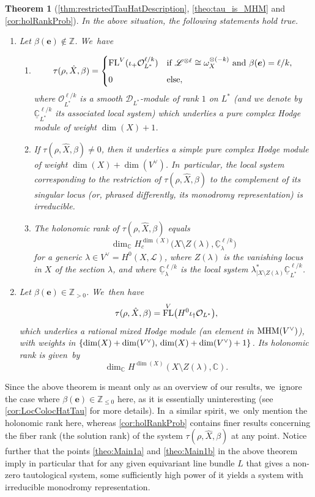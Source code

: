 \documentclass[JEP,XML,SOM,Unicode,published]{cedram}
\let\mathds\mathbb
\newcommand{\bme}{{\boldsymbol{e}}}
\newtheorem{thm}{Theorem}[section]
\newcommand{\dC}{{\mathds C}}\let\C\dC
\newcommand{\dZ}{{\mathds Z}}\let\mbz\dZ\let\Z\dZ
\newcommand{\cO}{\mathcal{O}}\let\O\cO
\DeclareMathOperator{\FL}{\textup{FL}}
\newcommand{\MHM}{\textup{MHM}}
\let\originalleft\left
\let\originalright\right
\renewcommand{\left}{\mathopen{}\mathclose\bgroup\originalleft}
\renewcommand{\right}{\aftergroup\egroup\originalright}
\begin{document}
\begin{thm}[\cref{thm:restrictedTauHatDescription}, \cref{theo:tau_is_MHM} and \cref{cor:holRankProb}]\label{theo:Main}
In the above situation, the following statements hold true.
\begin{enumerate}
\item\label{theo:Main1}
Let $\beta(\bme) \notin \dZ$. We~have
\begin{enumerate}
\item\label{theo:Main1a}
\[
\tau(\rho, \hat{X}, \beta)
=
\begin{cases}
\FL^V(\iota_+ \cO_{L^*}^{\ell/k}) &\textup{if } \mathscr L^{\otimes \ell} \cong \omega^{\otimes (-k)}_X \textup{ and }\beta(\bme) = \ell/k,\\[
5pt]
0 & \textup{else},
\end{cases}
\]
where $\cO_{L^*}^{\ell/k}$ is a smooth $\mathscr{D}_{L^*}$\nobreakdash-mod\-ule of rank $1$ on $L^*$ (and we denote by $\underline{\dC}_{L^*}^{\ell/k}$
its associated local system) which underlies a pure complex Hodge module of weight $\dim(X)+1$.
\item\label{theo:Main1b}
If $\tau(\rho, \hat{X}, \beta)\neq 0$, then it underlies a simple pure complex Hodge module of weight $\dim(X)+\dim(V^\vee)$. In~particular, the local system corresponding to the restriction of $\tau(\rho, \hat{X}, \beta)$ to the complement of its singular locus (or, phrased differently, its monodromy representation) is irreducible.
\item\label{theo:Main1c}
The holonomic rank of $\tau(\rho, \hat{X}, \beta)$ equals
\[
\dim_\dC H^{\dim(X)}_c\bigl(X \setminus Z(\lambda), \underline{\dC}_\lambda^{\ell/k}\bigr)
\]
for a generic $\lambda\in V^\vee=H^0(X,\mathscr{L})$, where
$Z(\lambda)$ is the vanishing locus in $X$ of the section $\lambda$, and where
$\underline{\dC}_\lambda^{\ell/k}$ is the local system
$\lambda_{|X\setminus Z(\lambda)}^* \underline{\dC}_{L^*}^{\ell/k}$.
\end{enumerate}
\item\label{theo:Main2}
Let $\beta(\bme) \in \dZ_{>0}$. We~then have
\[
\tau(\rho, \hat{X}, \beta) = \FL^V\left(H^0 \iota_\dag \cO_{L^*}\right),
\]
which underlies a rational mixed Hodge module (\ie an element in $\MHM(V^\vee)$), with weights in $\left\{\dim(X)+\dim(V^\vee),\, \dim(X)+\dim(V^\vee)+1\right\}$. Its holonomic rank is given~by
\[
\dim_\dC H^{\dim(X)}(X\setminus Z(\lambda), \dC).
\]
\end{enumerate}
\end{thm}
Since the above theorem is meant only as an overview of our results, we~ignore the case where $\beta(\bme)\in \dZ_{\leq 0}$ here, as it is essentially uninteresting (see \cref{cor:LocColocHatTau} for more details). In~a similar spirit, we~only mention the holonomic rank here, whereas
\cref{cor:holRankProb} contains finer results concerning the fiber rank (\resp the solution rank) of the system $\tau(\rho, \hat{X}, \beta)$ at any point. Notice further that the points \eqref{theo:Main1a} and \eqref{theo:Main1b} in the above theorem imply in particular that for any given equivariant line bundle $L$ that gives a non-zero tautological system, some sufficiently high power of it yields a system with irreducible monodromy representation.
\end{document}
